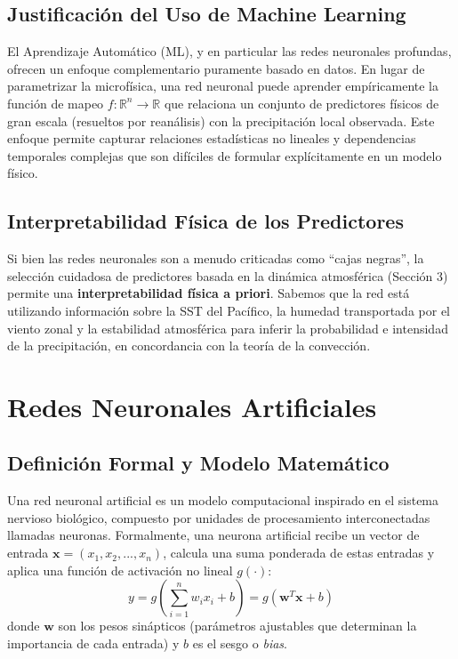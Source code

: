 \documentclass[titlepage,11pt]{report}
\begin{document}
\subsection{Justificación del Uso de Machine Learning}
El Aprendizaje Automático (ML), y en particular las redes neuronales profundas, ofrecen un enfoque complementario puramente basado en datos. En lugar de parametrizar la microfísica, una red neuronal puede aprender empíricamente la función de mapeo \(f: \mathbb{R}^n \to \mathbb{R}\) que relaciona un conjunto de predictores físicos de gran escala (resueltos por reanálisis) con la precipitación local observada. Este enfoque permite capturar relaciones estadísticas no lineales y dependencias temporales complejas que son difíciles de formular explícitamente en un modelo físico.

\subsection{Interpretabilidad Física de los Predictores}
Si bien las redes neuronales son a menudo criticadas como ``cajas negras'', la selección cuidadosa de predictores basada en la dinámica atmosférica (Sección 3) permite una \textbf{interpretabilidad física a priori}. Sabemos que la red está utilizando información sobre la SST del Pacífico, la humedad transportada por el viento zonal y la estabilidad atmosférica para inferir la probabilidad e intensidad de la precipitación, en concordancia con la teoría de la convección.

\section{Redes Neuronales Artificiales}

\subsection{Definición Formal y Modelo Matemático}
Una red neuronal artificial es un modelo computacional inspirado en el sistema nervioso biológico, compuesto por unidades de procesamiento interconectadas llamadas neuronas. Formalmente, una neurona artificial recibe un vector de entrada \(\mathbf{x} = (x_1, x_2, ..., x_n)\), calcula una suma ponderada de estas entradas y aplica una función de activación no lineal \(g(\cdot)\):
\begin{equation}
    y = g\left( \sum_{i=1}^{n} w_i x_i + b \right) = g(\mathbf{w}^T \mathbf{x} + b)
\end{equation}
donde \(\mathbf{w}\) son los pesos sinápticos (parámetros ajustables que determinan la importancia de cada entrada) y \(b\) es el sesgo o \textit{bias}.
\end{document}
